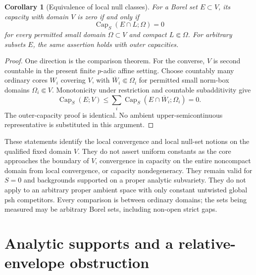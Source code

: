\documentclass[11pt,a4paper]{article}
\numberwithin{equation}{section}
\newtheorem{corollary}[theorem]{Corollary}
\theoremstyle{definition}
\theoremstyle{remark}
\begin{document}
\begin{corollary}[Equivalence of local null classes]
\label{cor:r2-fixed-domain-null-classes}
For a Borel set $E\subset V$, its capacity with domain $V$ is zero
if and only if
\[
 \operatorname{Cap}_S(E\cap L;\Omega)=0
\]
for every permitted small domain $\Omega\subset V$ and compact
$L\Subset\Omega$. For arbitrary subsets $E$, the same assertion
holds with outer capacities.
\end{corollary}

\begin{proof}
One direction is the comparison theorem. For the converse, $V$ is
second countable in the present finite $p$-adic affine setting.
Choose countably many ordinary cores $W_i$ covering $V$, with
$\overline W_i\Subset\Omega_i$ for permitted small norm-box domains
$\Omega_i\Subset V$. Monotonicity under restriction and countable
subadditivity give
\[
 \operatorname{Cap}_S(E;V)
 \leq\sum_i\operatorname{Cap}_S(E\cap\overline W_i;\Omega_i)=0.
\]
The outer-capacity proof is identical. No ambient upper-semicontinuous
representative is substituted in this argument.
\end{proof}

These statements identify the local convergence and local null-set
notions on the qualified fixed domain $V$. They do not assert uniform
constants as the core approaches the boundary of $V$, convergence in
capacity on the entire noncompact domain from local convergence, or
capacity nondegeneracy. They remain valid for $S=0$ and backgrounds
supported on a proper analytic subvariety. They do not apply to an
arbitrary proper ambient space with only constant untwisted global
psh competitors. Every comparison is between ordinary domains; the
sets being measured may be arbitrary Borel sets, including non-open
strict gaps.



\section{Analytic supports and a relative-envelope obstruction}
\label{sec:r2-support-envelopes}
\end{document}
